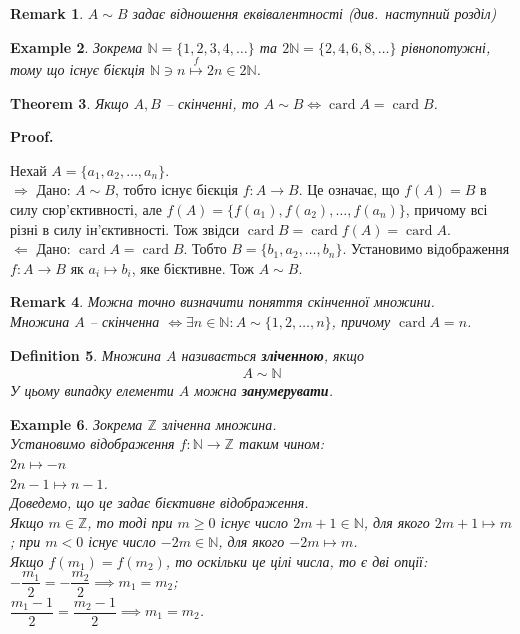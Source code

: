 \documentclass[a4paper, 14pt]{extarticle}
\makeatletter
\def\rightproof{$\boxed{\Rightarrow}$ }
\def\leftproof{$\boxed{\Leftarrow}$ }
\theoremstyle{theoremdd}
\newtheorem{theorem}{Theorem}[subsection]
\theoremstyle{theoremdd}
\newtheorem{definition}[theorem]{Definition}
\theoremstyle{theoremdd}
\theoremstyle{theoremdd}
\theoremstyle{theoremdd}
\newtheorem{example}[theorem]{Example}
\theoremstyle{theoremdd}
\theoremstyle{theoremdd}
\theoremstyle{theoremdd}
\theoremstyle{theoremdd}
\theoremstyle{theoremdd}
\theoremstyle{theoremdd}
\newtheorem{remark}[theorem]{Remark}
\theoremstyle{theoremdd}
\theoremstyle{theoremdd}
\theoremstyle{theoremdd}
\theoremstyle{theoremdd}
\renewenvironment{proof}[1][Proof.\\]{\par
\pushQED{\hfill \qed}%
\normalfont \topsep6\p@\@plus6\p@\relax
\trivlist
\item\relax
{\bfseries
#1\@addpunct{.}}\hspace\labelsep\ignorespaces
}{%
\popQED\endtrivlist\@endpefalse
}
\DeclareMathOperator{\card}{card}
\makeatother
\begin{document}
\begin{remark}
$A \sim B$ задає відношення еквівалентності (див.\ наступний розділ)
\end{remark}

\begin{example}
Зокрема $\mathbb{N} = \{1,2,3,4,\dots\}$ та $2 \mathbb{N} = \{2,4,6,8,\dots\}$ рівнопотужні, тому що існує бієкція $\mathbb{N} \ni n \overset{f}{\mapsto} 2n \in 2 \mathbb{N}$.
\end{example}

\begin{theorem}
Якщо $A,B$ -- скінченні, то $A \sim B \iff \card A = \card B$.
\end{theorem}

\begin{proof}
Нехай $A = \{a_1,a_2,\dots,a_n\}$.\\
\rightproof Дано: $A \sim B$, тобто існує бієкція $f \colon A \to B$. Це означає, що $f(A) = B$ в силу сюр'єктивності, але $f(A) = \{ f(a_1),f(a_2),\dots,f(a_n) \}$, причому всі різні в силу ін'єктив\-ності. Тож звідси $\card B = \card f(A) = \card A$.
\bigskip \\
\leftproof Дано: $\card A = \card B$. Тобто $B = \{b_1,a_2,\dots,b_n\}$. Установимо відображення $f \colon A \to B$ як $a_i \mapsto b_i$, яке бієктивне. Тож $A \sim B$.
\end{proof}

\begin{remark}
Можна точно визначити поняття скінченної множини.\\
Множина $A$ -- скінченна $\iff \exists n \in \mathbb{N}: A \sim \{1,2,\dots,n\}$, причому $\card A = n$.
\end{remark}

\begin{definition}
Множина $A$ називається \textbf{зліченною}, якщо
\begin{align*}
A \sim \mathbb{N}
\end{align*}
У цьому випадку елементи $A$ можна \textbf{занумерувати}.
\end{definition}

\begin{example}
Зокрема $\mathbb{Z}$ зліченна множина. \\
Установимо відображення $f \colon \mathbb{N} \to \mathbb{Z}$ таким чином:\\
$2n \mapsto -n$\\
$2n-1 \mapsto n-1$.\\
Доведемо, що це задає бієктивне відображення.\\
Якщо $m \in \mathbb{Z}$, то тоді при $m \geq 0$ існує число $2m+1 \in \mathbb{N}$, для якого $2m+1 \mapsto m$; при $m < 0$ існує число $-2m \in \mathbb{N}$, для якого $-2m \mapsto m$.\\
Якщо $f(m_1) = f(m_2)$, то оскільки це цілі числа, то є дві опції:\\
$-\dfrac{m_1}{2} = -\dfrac{m_2}{2} \implies m_1 = m_2$;\\
$\dfrac{m_1-1}{2} = \dfrac{m_2-1}{2} \implies m_1 = m_2$.
\end{example}
\end{document}
